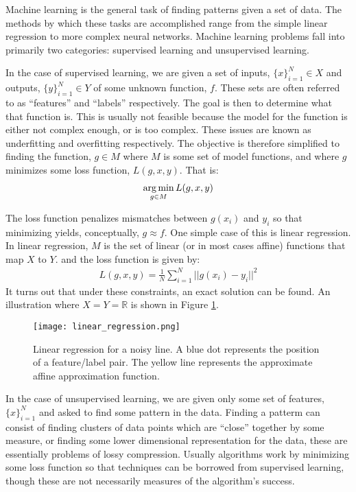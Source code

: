 \label{sec:machine_learning}
Machine learning is the general task of finding patterns given a set of data.  The methods by which these tasks are accomplished range from the simple linear regression to more complex neural networks.  Machine learning problems fall into primarily two categories: supervised learning and unsupervised learning.  \cite{bishop}

In the case of supervised learning, we are given a set of inputs, $\{x\}_{i=1}^N\in X$ and outputs, $\{y\}_{i=1}^N\in Y$ of some unknown function, $f$.  These sets are often referred to as ``features'' and ``labels'' respectively.  The goal is then to determine what that function is.  This is usually not feasible because the model for the function is either not complex enough, or is too complex.  These issues are known as underfitting and overfitting respectively.  The objective is therefore simplified to finding the function, $g \in M$ where $M$ is some set of model functions, and where $g$ minimizes some loss function, $L(g,x,y)$.  That is:
\begin{align}
\operatorname*{arg\,min}_{g \in M} L(g,x,y)
\end{align}

The loss function penalizes mismatches between $g(x_i)$ and $y_i$ so that minimizing yields, conceptually, $g \approx f$.  One simple case of this is linear regression.  In linear regression, $M$ is the set of linear (or in most cases affine) functions that map $X$ to $Y$. and the loss function is given by:
\begin{align}\label{eq:lin_loss}
L(g,x,y) = \frac{1}{N} \sum_{i=1}^N ||g(x_i)-y_i||^2
\end{align}
It turns out that under these constraints, an exact solution can be found.  An illustration where $X=Y= \mathbb{R}$ is shown in Figure \ref{fig:linear_regression}.

\begin{figure}
    \centering
    \texttt{[image: linear\_regression.png]}
    \caption{Linear regression for a noisy line.  A blue dot represents the position of a feature/label pair.  The yellow line represents the approximate affine approximation function.}
    \label{fig:linear_regression}
\end{figure}

In the case of unsupervised learning, we are given only some set of features, $\{x\}_{i=1}^N$ and asked to find some pattern in the data.  Finding a patterm can consist of finding clusters of data points which are ``close'' together by some measure, or finding some lower dimensional representation for the data, these are essentially problems of lossy compression.  Usually algorithms work by minimizing some loss function so that techniques can be borrowed from supervised learning, though these are not necessarily measures of the algorithm's success.  

